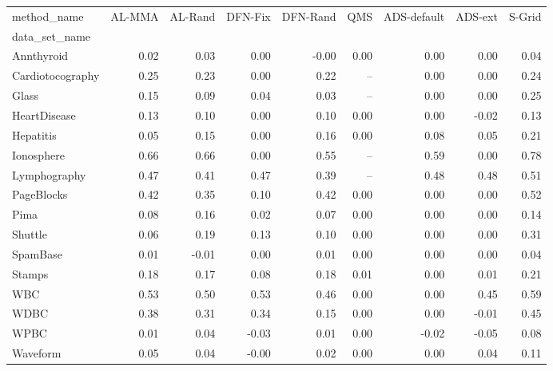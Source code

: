 \begin{tabular}{lrrrrrrrr}
\toprule
method\_name &  AL-MMA &  AL-Rand &  DFN-Fix &  DFN-Rand &  QMS &  ADS-default &  ADS-ext &  S-Grid \\
data\_set\_name    &         &          &          &           &      &              &          &         \\
\midrule
Annthyroid       &    0.02 &     0.03 &     0.00 &     -0.00 & 0.00 &         0.00 &     0.00 &    0.04 \\
Cardiotocography &    0.25 &     0.23 &     0.00 &      0.22 &   -- &         0.00 &     0.00 &    0.24 \\
Glass            &    0.15 &     0.09 &     0.04 &      0.03 &   -- &         0.00 &     0.00 &    0.25 \\
HeartDisease     &    0.13 &     0.10 &     0.00 &      0.10 & 0.00 &         0.00 &    -0.02 &    0.13 \\
Hepatitis        &    0.05 &     0.15 &     0.00 &      0.16 & 0.00 &         0.08 &     0.05 &    0.21 \\
Ionosphere       &    0.66 &     0.66 &     0.00 &      0.55 &   -- &         0.59 &     0.00 &    0.78 \\
Lymphography     &    0.47 &     0.41 &     0.47 &      0.39 &   -- &         0.48 &     0.48 &    0.51 \\
PageBlocks       &    0.42 &     0.35 &     0.10 &      0.42 & 0.00 &         0.00 &     0.00 &    0.52 \\
Pima             &    0.08 &     0.16 &     0.02 &      0.07 & 0.00 &         0.00 &     0.00 &    0.14 \\
Shuttle          &    0.06 &     0.19 &     0.13 &      0.10 & 0.00 &         0.00 &     0.00 &    0.31 \\
SpamBase         &    0.01 &    -0.01 &     0.00 &      0.01 & 0.00 &         0.00 &     0.00 &    0.04 \\
Stamps           &    0.18 &     0.17 &     0.08 &      0.18 & 0.01 &         0.00 &     0.01 &    0.21 \\
WBC              &    0.53 &     0.50 &     0.53 &      0.46 & 0.00 &         0.00 &     0.45 &    0.59 \\
WDBC             &    0.38 &     0.31 &     0.34 &      0.15 & 0.00 &         0.00 &    -0.01 &    0.45 \\
WPBC             &    0.01 &     0.04 &    -0.03 &      0.01 & 0.00 &        -0.02 &    -0.05 &    0.08 \\
Waveform         &    0.05 &     0.04 &    -0.00 &      0.02 & 0.00 &         0.00 &     0.04 &    0.11 \\
\bottomrule
\end{tabular}
